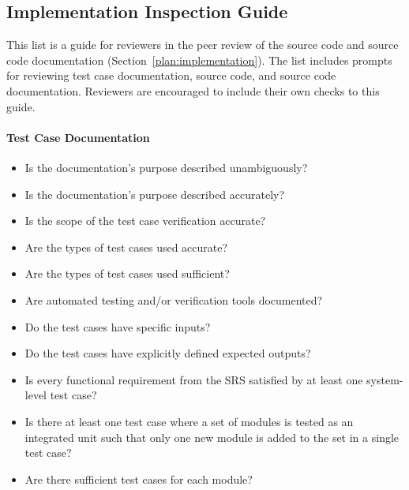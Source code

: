 \subsection{Implementation Inspection
Guide}\label{appendix:verificationInspection}
This list is a guide for reviewers in the peer review of the source code and
source code documentation (Section~\ref{plan:implementation}). The list
includes prompts for reviewing test case documentation, source code, and source
code documentation. Reviewers are encouraged to include their own checks to
this guide.

\paragraph{Test Case Documentation}
\begin{itemize}

    \item Is the documentation's purpose described unambiguously?

    \item Is the documentation's purpose described accurately?

    \item Is the scope of the test case verification accurate?

    \item Are the types of test cases used accurate?

    \item Are the types of test cases used sufficient?

    \item Are automated testing and/or verification tools documented?

    \item Do the test cases have specific inputs?

    \item Do the test cases have explicitly defined expected outputs?

    \item Is every functional requirement from the SRS satisfied by at least
    one system-level test case?

    \item Is there at least one test case where a set of modules is tested as
    an integrated unit such that only one new module is added to the set in a
    single test case?

    \item Are there sufficient test cases for each module?

\end{itemize}


